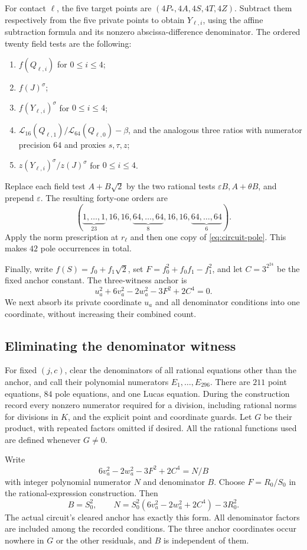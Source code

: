 For contact $\ell$, the five target points are
$(4P_*,4A,4S,4T,4Z)$. Subtract them respectively from the five
private points to obtain $Y_{\ell,i}$, using the affine subtraction
formula and its nonzero abscissa-difference denominator. The ordered
twenty field tests are the following:
\begin{enumerate}
\item $f(Q_{\ell,i})$ for $0\leq i\leq4$;
\item $f(J)^\sigma$;
\item $f(Y_{\ell,i})^\sigma$ for $0\leq i\leq4$;
\item $\mathcal L_{16}(Q_{\ell,1})/\mathcal L_{64}(Q_{\ell,0})-\beta$,
and the analogous three ratios with numerator precision $64$ and
proxies $s,\tau,z$;
\item $z(Y_{\ell,i})^\sigma/z(J)^\sigma$ for $0\leq i\leq4$.
\end{enumerate}
Replace each field test $A+B\sqrt2$ by the two rational tests
$\varepsilon B,A+\theta B$, and prepend $\varepsilon$. The
resulting forty-one orders are
\[
 (\underbrace{1,\ldots,1}_{23},16,16,
 \underbrace{64,\ldots,64}_{8},16,16,
 \underbrace{64,\ldots,64}_{6}).
\]
Apply the norm prescription at $r_\ell$ and then one copy of
\eqref{eq:circuit-pole}. This makes $42$ pole occurrences in total.

Finally, write $f(S)=f_0+f_1\sqrt2$, set
$F=f_0^2+f_0f_1-f_1^2$, and let $C=3^{2^{24}}$ be the fixed
anchor constant. The three-witness anchor is
\[
 u_a^2+6v_a^2-2w_a^2-3F^2+2C^4=0.
\]
We next absorb its private coordinate $u_a$ and all denominator
conditions into one coordinate, without increasing their combined count.

\subsection{Eliminating the denominator witness}

For fixed $(j,c)$, clear the denominators of all rational equations
other than the anchor, and call their polynomial numerators
$E_1,\ldots,E_{296}$. There are $211$ point equations, $84$ pole
equations, and one Lucas equation. During the construction record every
nonzero numerator required for a division, including rational norms
for divisions in $K$, and the explicit point and coordinate guards.
Let $G$ be their product, with repeated factors omitted if desired.
All the rational functions used are defined whenever $G\ne0$.

Write
\[
 6v_a^2-2w_a^2-3F^2+2C^4=N/B
\]
with integer polynomial numerator $N$ and denominator $B$. Choose
$F=R_0/S_0$ in the rational-expression construction. Then
\[
 B=S_0^2,\qquad
 N=S_0^2(6v_a^2-2w_a^2+2C^4)-3R_0^2.
\]
The actual circuit's cleared anchor has exactly this form.
All denominator factors are included among the recorded conditions.
The three anchor coordinates occur nowhere in $G$ or the other
residuals, and $B$ is independent of them.

